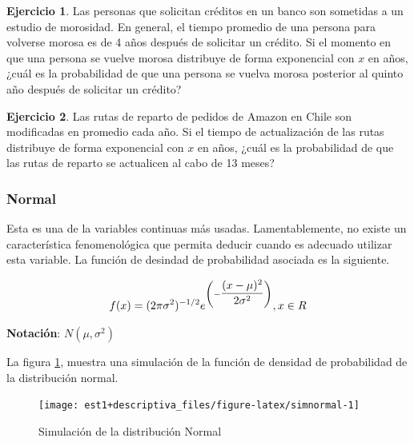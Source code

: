 \documentclass[
  11pt,
]{book}
\theoremstyle{definition}
\theoremstyle{definition}
\theoremstyle{definition}
\newtheorem{exercise}{Ejercicio}[chapter]
\theoremstyle{definition}
\theoremstyle{remark}
\begin{document}
\begin{exercise}
Las personas que solicitan créditos en un banco son sometidas a un estudio de morosidad. En general, el tiempo promedio de una persona para volverse morosa es de 4 años después de solicitar un crédito. Si el momento en que una persona se vuelve morosa distribuye de forma exponencial con \(x\) en años, ¿cuál es la probabilidad de que una persona se vuelva morosa posterior al quinto año después de solicitar un crédito?
\end{exercise}

\begin{exercise}
Las rutas de reparto de pedidos de Amazon en Chile son modificadas en promedio cada año. Si el tiempo de actualización de las rutas distribuye de forma exponencial con \(x\) en años, ¿cuál es la probabilidad de que las rutas de reparto se actualicen al cabo de 13 meses?
\end{exercise}

\subsubsection{Normal}\label{probabilidad-variable-aleatoria-continua-distribuciones-normal}

Esta es una de la variables continuas más usadas. Lamentablemente, no existe un característica fenomenológica que permita deducir cuando es adecuado utilizar esta variable. La función de desindad de probabilidad asociada es la siguiente.

\begin{equation}
\notag
f(x)= (2\pi \sigma^2)^{-1/2}e^{\left( -\displaystyle\frac{(x-\mu)^2}{2\sigma^2} \right)} ,x \in R
\end{equation}

\textbf{Notación}: \(N(\mu, \sigma^2)\)

La figura \ref{fig:simnormal}, muestra una simulación de la función de densidad de probabilidad de la distribución normal.

\begin{figure}

{\centering \texttt{[image: est1+descriptiva\_files/figure-latex/simnormal-1]} 

}

\caption{Simulación de la distribución Normal}\label{fig:simnormal}
\end{figure}
\end{document}

